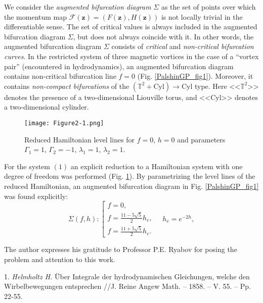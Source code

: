 We consider the \textit{augmented bifurcation diagram} $\Sigma$ as the set of points over which the momentum map $\mathcal{F}(\boldsymbol{z})=(F(\boldsymbol{z}),H(\boldsymbol{z}))$ is not locally trivial in the differentiable sense. The set of critical values is always included in the augmented bifurcation diagram $\Sigma$, but does not always coincide with it. In other words, the augmented bifurcation diagram $\Sigma$ consists of \textit{critical} and \textit{non-critical bifurcation curves}. In the restricted system of three magnetic vortices in the case of a ``vortex pair'' (encountered in hyd\-ro\-dyna\-mics), an augmented bifurcation diagram contains non-critical bifurcation line $f=0$ (Fig. \ref{PalshinGP_fig1}). Moreover, it contains \textit{non-compact bifurcations} of the $\left( \mathbb{T}^2 + \mathrm{Cyl} \right) \rightarrow \mathrm{Cyl}$ type. Here <<$\mathbb{T}^2$>> denotes the presence of a two-dimensional Liouville torus, and <<$\mathrm{Cyl}$>> denotes a two-dimensional cylinder.

\begin{figure}[!t]
  \centering
  \texttt{[image: Figure2-1.png]}
  \caption{Reduced Hamiltonian level lines for $f=0$, $h = 0$ and parameters $\Gamma_1=1$, $\Gamma_2=-1$, $\lambda_1=1$, $\lambda_2=1$.}\label{PalshinGP_fig2}
\end{figure}

For the system $(1)$ an explicit reduction to a Hamiltonian system with one degree of freedom was performed (Fig. \ref{PalshinGP_fig2}). By pa\-ra\-met\-ri\-zing the level lines of the reduced Hamiltonian, an aug\-men\-ted bi\-fur\-ca\-tion diagram in Fig. \ref{PalshinGP_fig1} was found explicitly:
\begin{equation*}
\Sigma(f,h): \left[
\begin{array}{l}
\displaystyle{
f=0,}
\\[3mm]
\displaystyle{
f=\frac{11-5\sqrt{5}}{2} h_e,}
\\[3mm]
\displaystyle{
f=\frac{11+5\sqrt{5}}{2} h_e.}
\end{array}
\right.
\quad
h_e=e^{-2h},
\end{equation*}

The author expresses his gratitude to Professor P.E. Ryabov for posing the problem and attention to this work.

\litlist

1. {\it Helmholtz H.}
  \"{U}ber Integrale der hydrodynamischen Glei\-chun\-gen, welche den Wirbelbewegungen entsprechen //J. Reine Angew Math. -- 1858. -- V. 55. -- Pp. 22-55.


